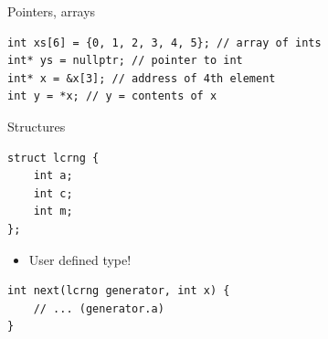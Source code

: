 \documentclass[10pt]{beamer}
\begin{document}
\begin{frame}[fragile,label={sec:org4cc1bcd}]{Pointers, arrays}
 \begin{verbatim}
int xs[6] = {0, 1, 2, 3, 4, 5}; // array of ints
int* ys = nullptr; // pointer to int
int* x = &x[3]; // address of 4th element
int y = *x; // y = contents of x
\end{verbatim}
\end{frame}
\begin{frame}[fragile,label={sec:orgef60fa1}]{Structures}
 \begin{verbatim}
struct lcrng {
    int a;
    int c;
    int m;
};
\end{verbatim}

\begin{itemize}
\item \alert{User defined type}!
\end{itemize}

\begin{verbatim}
int next(lcrng generator, int x) {
    // ... (generator.a)
}
\end{verbatim}
\end{frame}
\end{document}
